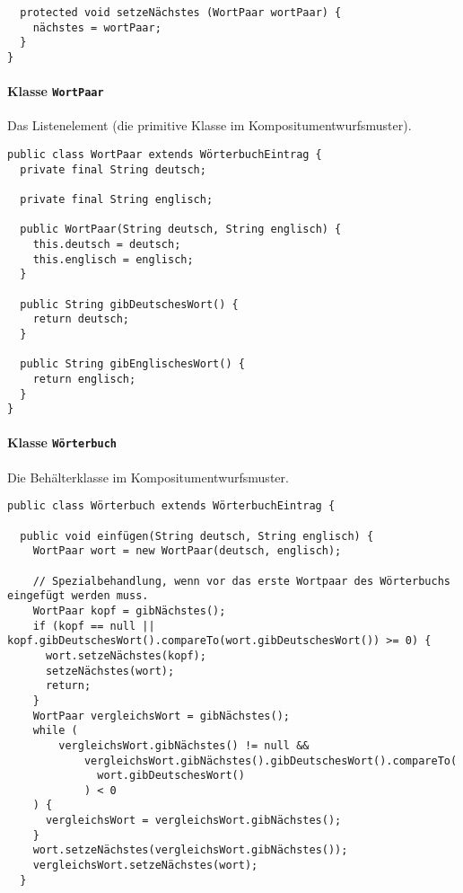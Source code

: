 \documentclass{lehramt-informatik}
\begin{document}
\begin{itemize}
\begin{verbatim}
  protected void setzeNächstes (WortPaar wortPaar) {
    nächstes = wortPaar;
  }
}
\end{verbatim}

%

\paragraph{Klasse \texttt{WortPaar}}

Das Listenelement (die primitive Klasse im Kompositumentwurfsmuster).

\begin{verbatim}
public class WortPaar extends WörterbuchEintrag {
  private final String deutsch;

  private final String englisch;

  public WortPaar(String deutsch, String englisch) {
    this.deutsch = deutsch;
    this.englisch = englisch;
  }

  public String gibDeutschesWort() {
    return deutsch;
  }

  public String gibEnglischesWort() {
    return englisch;
  }
}
\end{verbatim}

%

\paragraph{Klasse \texttt{Wörterbuch}}

Die Behälterklasse im Kompositumentwurfsmuster.

\begin{verbatim}
public class Wörterbuch extends WörterbuchEintrag {

  public void einfügen(String deutsch, String englisch) {
    WortPaar wort = new WortPaar(deutsch, englisch);

    // Spezialbehandlung, wenn vor das erste Wortpaar des Wörterbuchs eingefügt werden muss.
    WortPaar kopf = gibNächstes();
    if (kopf == null || kopf.gibDeutschesWort().compareTo(wort.gibDeutschesWort()) >= 0) {
      wort.setzeNächstes(kopf);
      setzeNächstes(wort);
      return;
    }
    WortPaar vergleichsWort = gibNächstes();
    while (
        vergleichsWort.gibNächstes() != null &&
            vergleichsWort.gibNächstes().gibDeutschesWort().compareTo(
              wort.gibDeutschesWort()
            ) < 0
    ) {
      vergleichsWort = vergleichsWort.gibNächstes();
    }
    wort.setzeNächstes(vergleichsWort.gibNächstes());
    vergleichsWort.setzeNächstes(wort);
  }


\end{verbatim}
\end{itemize}
\end{document}
